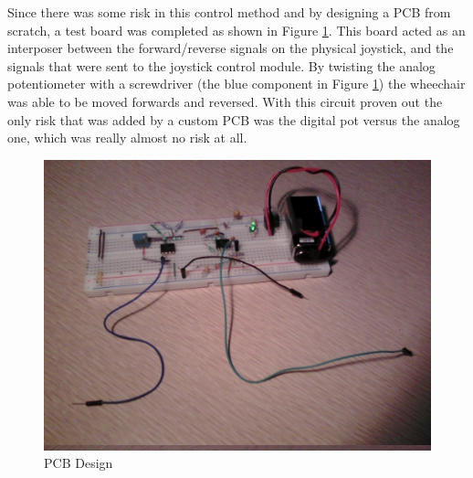 \documentclass[oneside,final,a4paper]{report}
\begin{document}
Since there was some risk in this control method and by designing a PCB from scratch, a test board was completed as shown in Figure \ref{fig:test_joystick}. This board acted as an interposer between the forward/reverse signals on the physical joystick, and the signals that were sent to the joystick control module. By twisting the analog potentiometer with a screwdriver (the blue component in Figure \ref{fig:test_joystick}) the wheechair was able to be moved forwards and reversed. With this circuit proven out the only risk that was added by a custom PCB was the digital pot versus the analog one, which was really almost no risk at all.
\begin{figure}[hbt]
 \centering
 \includegraphics[scale=0.5]{test_circuit}
 \caption{PCB Design}\label{fig:test_joystick}
\end{figure}
\end{document}
